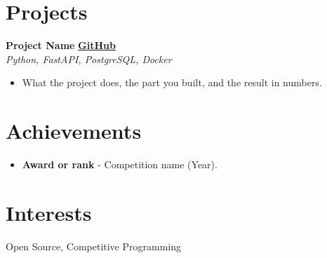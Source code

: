 \documentclass[11pt,a4paper]{article}
\begin{document}
\section{Projects}
\textbf{Project Name} \hfill \href{https://github.com/your-username/project}{\textbf{GitHub}}\\
\textit{Python, FastAPI, PostgreSQL, Docker}
\begin{itemize}[nosep,left=0pt]
    \item What the project does, the part you built, and the result in numbers.
\end{itemize}

\section{Achievements}
\begin{itemize}
    \item \textbf{Award or rank} - Competition name (Year).
\end{itemize}

\section{Interests}
Open Source, Competitive Programming
\end{document}
